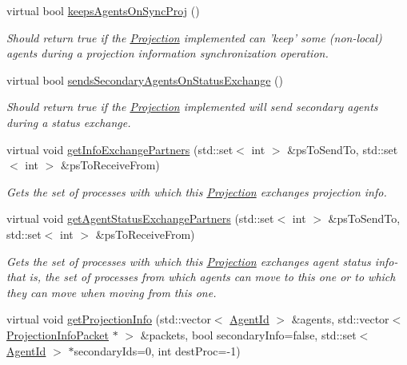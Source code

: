 \begin{DoxyCompactItemize}
\item 
virtual bool \hyperlink{classrepast_1_1_graph_aedaa8e44eb04056df2acabbeba373201}{keeps\-Agents\-On\-Sync\-Proj} ()
\begin{DoxyCompactList}\small\item\em Should return true if the \hyperlink{classrepast_1_1_projection}{Projection} implemented can 'keep' some (non-\/local) agents during a projection information synchronization operation. \end{DoxyCompactList}\item 
virtual bool \hyperlink{classrepast_1_1_graph_a80cd467aae6d5e2c381bbe9cade6cbba}{sends\-Secondary\-Agents\-On\-Status\-Exchange} ()
\begin{DoxyCompactList}\small\item\em Should return true if the \hyperlink{classrepast_1_1_projection}{Projection} implemented will send secondary agents during a status exchange. \end{DoxyCompactList}\item 
virtual void \hyperlink{classrepast_1_1_graph_ab4200382f280c05f020611428507a134}{get\-Info\-Exchange\-Partners} (std\-::set$<$ int $>$ \&ps\-To\-Send\-To, std\-::set$<$ int $>$ \&ps\-To\-Receive\-From)
\begin{DoxyCompactList}\small\item\em Gets the set of processes with which this \hyperlink{classrepast_1_1_projection}{Projection} exchanges projection info. \end{DoxyCompactList}\item 
virtual void \hyperlink{classrepast_1_1_graph_a3e9a52d6d45473260e2771fe426c8a15}{get\-Agent\-Status\-Exchange\-Partners} (std\-::set$<$ int $>$ \&ps\-To\-Send\-To, std\-::set$<$ int $>$ \&ps\-To\-Receive\-From)
\begin{DoxyCompactList}\small\item\em Gets the set of processes with which this \hyperlink{classrepast_1_1_projection}{Projection} exchanges agent status info-\/ that is, the set of processes from which agents can move to this one or to which they can move when moving from this one. \end{DoxyCompactList}\item 
\hypertarget{classrepast_1_1_graph_ad3cffccc052f93d644a0d58630577ea0}{virtual void \hyperlink{classrepast_1_1_graph_ad3cffccc052f93d644a0d58630577ea0}{get\-Projection\-Info} (std\-::vector$<$ \hyperlink{classrepast_1_1_agent_id}{Agent\-Id} $>$ \&agents, std\-::vector$<$ \hyperlink{classrepast_1_1_projection_info_packet}{Projection\-Info\-Packet} $\ast$ $>$ \&packets, bool secondary\-Info=false, std\-::set$<$ \hyperlink{classrepast_1_1_agent_id}{Agent\-Id} $>$ $\ast$secondary\-Ids=0, int dest\-Proc=-\/1)}\label{classrepast_1_1_graph_ad3cffccc052f93d644a0d58630577ea0}


\end{DoxyCompactItemize}
